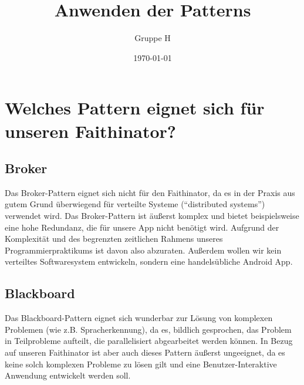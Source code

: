 \documentclass{scrreprt}
\title{Anwenden der Patterns}
\author{Gruppe H}
\date{\today}
\begin{document}
\maketitle
\tableofcontents

\part{Welches Pattern eignet sich für unseren Faithinator?}

\chapter{Broker}
Das Broker-Pattern eignet sich nicht für den Faithinator, da es in der Praxis aus gutem Grund überwiegend für verteilte Systeme (“distributed systems”) verwendet wird. Das Broker-Pattern ist äußerst komplex und bietet beispielsweise eine hohe Redundanz, die für unsere App nicht benötigt wird. Aufgrund der Komplexität und des begrenzten zeitlichen Rahmens unseres Programmierpraktikums ist davon also abzuraten. Außerdem wollen wir kein verteiltes Softwaresystem entwickeln, sondern eine handelsübliche Android App.

\chapter{Blackboard}
Das Blackboard-Pattern eignet sich wunderbar zur Lösung von komplexen Problemen (wie z.B. Spracherkennung), da es, bildlich gesprochen, das Problem in Teilprobleme aufteilt, die parallelisiert abgearbeitet werden können. In Bezug auf unseren Faithinator ist aber auch dieses Pattern äußerst ungeeignet, da es keine solch komplexen Probleme zu lösen gilt und eine Benutzer-Interaktive Anwendung entwickelt werden soll.
\end{document}
